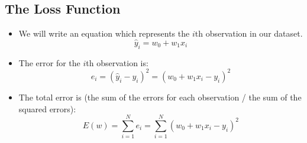 \documentclass[12pt]{article}
\begin{document}
        \subsection{The Loss Function}
            \begin{itemize}
                \item We will write an equation which represents the $i$th observation in our dataset.
                \begin{equation}
                    \hat{y}_i = w_0 + w_1x_i
                \end{equation}
                \item The error for the $i$th observation is:
                \begin{equation}
                    e_i = {(\hat{y}_i - y_i)}^2 = {(w_0 + w_1x_i - y_i)}^2
                \end{equation}
                \item The total error is (the sum of the errors for each observation / the sum of the squared errors):
                \begin{equation}
                    E(w) = \sum_{i=1}^N e_i = \sum_{i=1}^N {(w_0 + w_1x_i - y_i)}^2
                \end{equation}
            \end{itemize}
\end{document}

